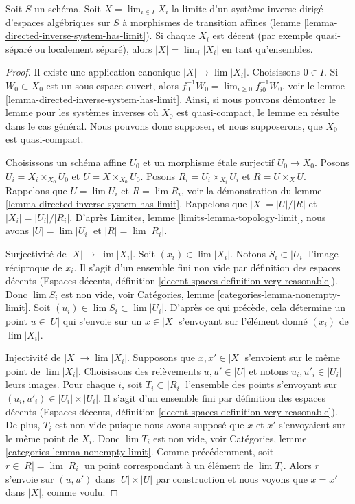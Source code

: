 \begin{lemma}
\label{lemma-inverse-limit-sets}
Soit $S$ un schéma. Soit $X = \lim_{i \in I} X_i$ la limite d'un système inverse dirigé
d'espaces algébriques sur $S$ à morphismes de transition affines
(lemme \ref{lemma-directed-inverse-system-has-limit}). Si chaque $X_i$
est décent (par exemple quasi-séparé ou localement séparé),
alors $|X| = \lim_i |X_i|$ en tant qu'ensembles.
\end{lemma}

\begin{proof}
Il existe une application canonique $|X| \to \lim |X_i|$. Choisissons $0 \in I$.
Si $W_0 \subset X_0$ est un sous-espace ouvert, alors
$f_0^{-1}W_0 = \lim_{i \geq 0} f_{i0}^{-1}W_0$, voir
le lemme \ref{lemma-directed-inverse-system-has-limit}.
Ainsi, si nous pouvons démontrer le lemme pour les systèmes inverses où $X_0$
est quasi-compact, le lemme en résulte dans le cas général. Nous pouvons donc supposer, et
nous supposerons, que $X_0$ est quasi-compact.

\medskip\noindent
Choisissons un schéma affine $U_0$ et un morphisme \'etale surjectif $U_0 \to X_0$.
Posons $U_i = X_i \times_{X_0} U_0$ et $U = X \times_{X_0} U_0$.
Posons $R_i = U_i \times_{X_i} U_i$ et $R = U \times_X U$.
Rappelons que $U = \lim U_i$ et $R = \lim R_i$, voir la démonstration du
lemme \ref{lemma-directed-inverse-system-has-limit}.
Rappelons que $|X| = |U|/|R|$ et $|X_i| = |U_i|/|R_i|$. D'après
Limites, lemme \ref{limits-lemma-topology-limit}, nous avons
$|U| = \lim |U_i|$ et $|R| = \lim |R_i|$.

\medskip\noindent
Surjectivité de $|X| \to \lim |X_i|$. Soit $(x_i) \in \lim |X_i|$. Notons
$S_i \subset |U_i|$ l'image réciproque de $x_i$. Il s'agit d'un ensemble fini non vide
par définition des espaces décents
(Espaces décents, définition \ref{decent-spaces-definition-very-reasonable}).
Donc $\lim S_i$ est non vide, voir
Catégories, lemme \ref{categories-lemma-nonempty-limit}.
Soit $(u_i) \in \lim S_i \subset \lim |U_i|$. D'après ce qui précède, cela détermine
un point $u \in |U|$ qui s'envoie sur un $x \in |X|$ s'envoyant sur l'élément donné
$(x_i)$ de $\lim |X_i|$.

\medskip\noindent
Injectivité de $|X| \to \lim |X_i|$. Supposons que $x, x' \in |X|$
s'envoient sur le même point de $\lim |X_i|$. Choisissons des relèvements $u, u' \in |U|$
et notons $u_i, u'_i \in |U_i|$ leurs images.
Pour chaque $i$, soit $T_i \subset |R_i|$ l'ensemble des points s'envoyant
sur $(u_i, u'_i) \in |U_i| \times |U_i|$. Il s'agit d'un ensemble fini
par définition des espaces décents
(Espaces décents, définition \ref{decent-spaces-definition-very-reasonable}).
De plus, $T_i$ est non vide puisque nous avons supposé que $x$ et $x'$ s'envoyaient sur
le même point de $X_i$. Donc $\lim T_i$ est non vide, voir
Catégories, lemme \ref{categories-lemma-nonempty-limit}.
Comme précédemment, soit $r \in |R| = \lim |R_i|$ un point correspondant à un
élément de $\lim T_i$. Alors $r$ s'envoie sur $(u, u')$ dans $|U| \times |U|$
par construction et nous voyons que $x = x'$ dans $|X|$, comme voulu.


\end{proof}

